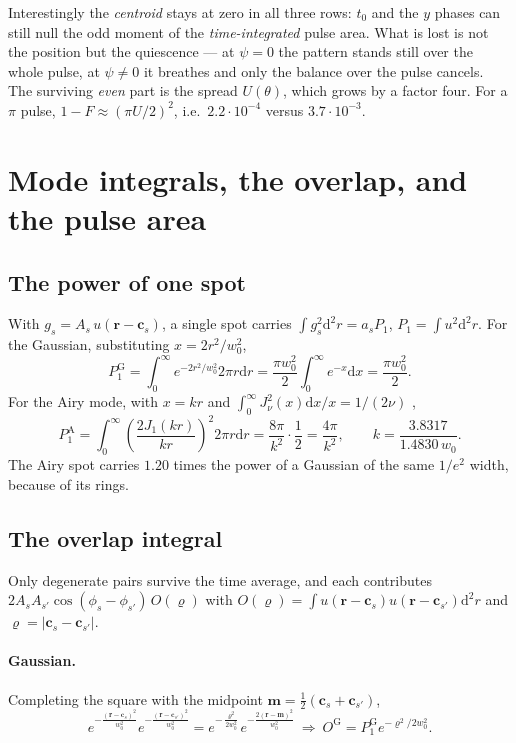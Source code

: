 \documentclass[11pt,a4paper]{article}
\newcommand{\dd}{\mathrm d}
\begin{document}
\noindent Interestingly the \emph{centroid} stays at zero in all three rows:
$t_0$ and the $y$ phases can still null the odd moment of the
\emph{time-integrated} pulse area. What is lost is not the position but the
quiescence --- at $\psi=0$ the pattern stands still over the whole pulse, at
$\psi\neq0$ it breathes and only the balance over the pulse cancels. The
surviving \emph{even} part is the spread $U(\theta)$, which grows by a factor
four. For a $\pi$ pulse, $1-F\approx(\pi U/2)^2$, i.e.\ $2.2\cdot10^{-4}$
versus $3.7\cdot10^{-3}$.

\section{Mode integrals, the overlap, and the pulse area}\label{sec:area}

\subsection{The power of one spot}\label{sec:P1}
With $g_s=A_s\,u(\mathbf r-\mathbf c_s)$, a single spot carries
$\int g_s^2\dd^2r=a_sP_1$, $P_1=\int u^2\dd^2r$. For the Gaussian, substituting
$x=2r^2/w_0^2$,
\begin{equation}
P_1^\mathrm{G}=\int_0^\infty e^{-2r^2/w_0^2}2\pi r\dd r
=\frac{\pi w_0^2}{2}\int_0^\infty e^{-x}\dd x=\frac{\pi w_0^2}{2} .
\end{equation}
For the Airy mode, with $x=kr$ and
$\int_0^\infty J_\nu^2(x)\dd x/x=1/(2\nu)$ \citep{dlmf},
\begin{equation}
P_1^\mathrm{A}=\int_0^\infty\!\left(\frac{2J_1(kr)}{kr}\right)^{\!2}\!2\pi r\dd r
=\frac{8\pi}{k^2}\cdot\frac12=\frac{4\pi}{k^2},
\qquad k=\frac{3.8317}{1.4830\,w_0} .
\end{equation}
The Airy spot carries $1.20$ times the power of a Gaussian of the same
$1/e^2$ width, because of its rings.

\subsection{The overlap integral}\label{sec:overlap}
Only degenerate pairs survive the time average, and each contributes
$2A_sA_{s'}\cos(\phi_s-\phi_{s'})\,O(\varrho)$ with
$O(\varrho)=\int u(\mathbf r-\mathbf c_s)u(\mathbf r-\mathbf c_{s'})\dd^2r$ and
$\varrho=|\mathbf c_s-\mathbf c_{s'}|$.

\paragraph{Gaussian.} Completing the square with the midpoint
$\mathbf m=\tfrac12(\mathbf c_s+\mathbf c_{s'})$,
\begin{equation}
e^{-\frac{(\mathbf r-\mathbf c_s)^2}{w_0^2}}
e^{-\frac{(\mathbf r-\mathbf c_{s'})^2}{w_0^2}}
=e^{-\frac{\varrho^2}{2w_0^2}}e^{-\frac{2(\mathbf r-\mathbf m)^2}{w_0^2}}
\ \Longrightarrow\
O^\mathrm{G}=P_1^\mathrm{G}e^{-\varrho^2/2w_0^2} .
\end{equation}
\end{document}
